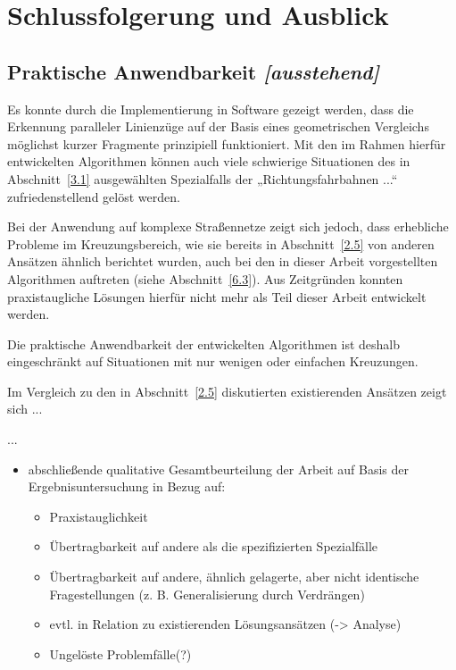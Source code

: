 \documentclass[../main/thesis.tex]{subfiles}
\begin{document}
\chapter{Schlussfolgerung und Ausblick}

\section{Praktische Anwendbarkeit \emph{[ausstehend]}}

Es konnte durch die Implementierung in Software gezeigt werden, dass die Erkennung paralleler Linienzüge auf der Basis eines geometrischen Vergleichs möglichst kurzer Fragmente prinzipiell funktioniert.
Mit den im Rahmen hierfür entwickelten Algorithmen können auch viele schwierige Situationen des in Abschnitt~\ref{3.1} ausgewählten Spezialfalls der „Richtungsfahrbahnen ...“ zufriedenstellend gelöst werden.

Bei der Anwendung auf komplexe Straßennetze zeigt sich jedoch, dass erhebliche Probleme im Kreuzungsbereich, wie sie bereits in Abschnitt~\ref{2.5} von anderen Ansätzen ähnlich berichtet wurden, auch bei den in dieser Arbeit vorgestellten Algorithmen auftreten (siehe Abschnitt~\ref{6.3}).
Aus Zeitgründen konnten praxistaugliche Lösungen hierfür nicht mehr als Teil dieser Arbeit entwickelt werden.

Die praktische Anwendbarkeit der entwickelten Algorithmen ist deshalb eingeschränkt auf Situationen mit nur wenigen oder einfachen Kreuzungen.

Im Vergleich zu den in Abschnitt~\ref{2.5} diskutierten existierenden Ansätzen zeigt sich ...

...



\begin{itemize}
	\item abschließende qualitative Gesamtbeurteilung der Arbeit auf Basis der Ergebnisuntersuchung in Bezug auf:
	\begin{itemize}
		\item Praxistauglichkeit
		\item Übertragbarkeit auf andere als die spezifizierten Spezialfälle
		\item Übertragbarkeit auf andere, ähnlich gelagerte, aber nicht identische Fragestellungen (z. B. Generalisierung durch Verdrängen)
		\item evtl. in Relation zu existierenden Lösungsansätzen (-> Analyse)
		\item Ungelöste Problemfälle(?)
	\end{itemize}
\end{itemize}
\end{document}
